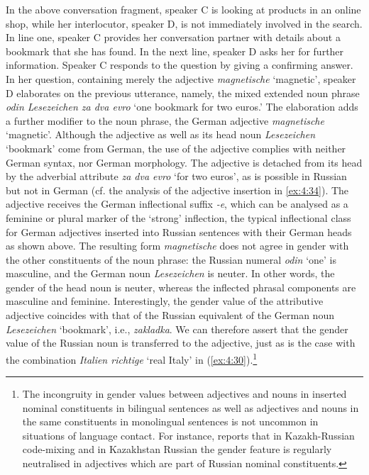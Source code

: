 \noindent In the above conversation fragment, speaker C is looking at products in an online shop, while her interlocutor, speaker D, is not immediately involved in the search. In line one, speaker C provides her conversation partner with details about a bookmark that she has found. In the next line, speaker D asks her for further information. Speaker C responds to the question by giving a confirming answer. In her question, containing merely the adjective \textit{magnetische} `magnetic', speaker D elaborates on the previous utterance, namely, the mixed extended noun phrase \textit{odin Lesezeichen za dva evro} `one bookmark for two euros.' The elaboration adds a further modifier to the noun phrase, the German adjective \textit{magnetische} `magnetic'. Although the adjective as well as its head noun \textit{Lesezeichen} `bookmark' come from German, the use of the adjective complies with neither German syntax, nor German morphology. The adjective is detached from its head by the adverbial attribute \textit{za dva evro} `for two euros', as is possible in Russian but not in German (cf. the analysis of the adjective insertion in \ref{ex:4:34}). The adjective receives the German inflectional suffix \textit{-e}, which can be analysed as a feminine or plural marker of the `strong' inflection, the typical inflectional class for German adjectives inserted into Russian sentences with their German heads as shown above. The resulting form \textit{magnetische} does not agree in gender with the other constituents of the noun phrase: the Russian numeral \textit{odin} `one' is masculine, and the German noun \textit{Lesezeichen} is neuter. In other words, the gender of the head noun is neuter, whereas the inflected phrasal components are masculine and feminine. Interestingly, the gender value of the attributive adjective coincides with that of the Russian equivalent of the German noun \textit{Lesezeichen} `bookmark', i.e., \textit{zakladka}. We can therefore assert that the gender value of the Russian noun is transferred to the adjective, just as is the case with the combination \textit{Italien richtige} `real Italy' in (\ref{ex:4:30}).\footnote{The incongruity in gender values between adjectives and nouns in inserted nominal constituents in bilingual sentences as well as adjectives and nouns in the same constituents in monolingual sentences is not uncommon in situations of language contact. For instance, \citet{muhamedowa-untersuchung-2006} reports that in Kazakh-Russian code-mixing and in Kazakhstan Russian the gender feature is regularly neutralised in adjectives which are part of Russian nominal constituents.}

